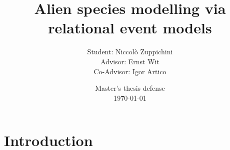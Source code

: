 \documentclass[
	11pt, %
]{beamer}
\title[]{Alien species modelling via relational event models} %
\author[]{Student: Niccol\`o Zuppichini \\ Advisor: Ernst Wit \\ Co-Advisor: Igor Artico} %
\institute[USI]{Universit\`a della Svizzera Italiana} %
\date[\today]{Master's thesis defense\\ \today} %
\begin{document}

\begin{frame}
	\titlepage %
\end{frame}



%	


\section{Introduction} %
\end{document}
